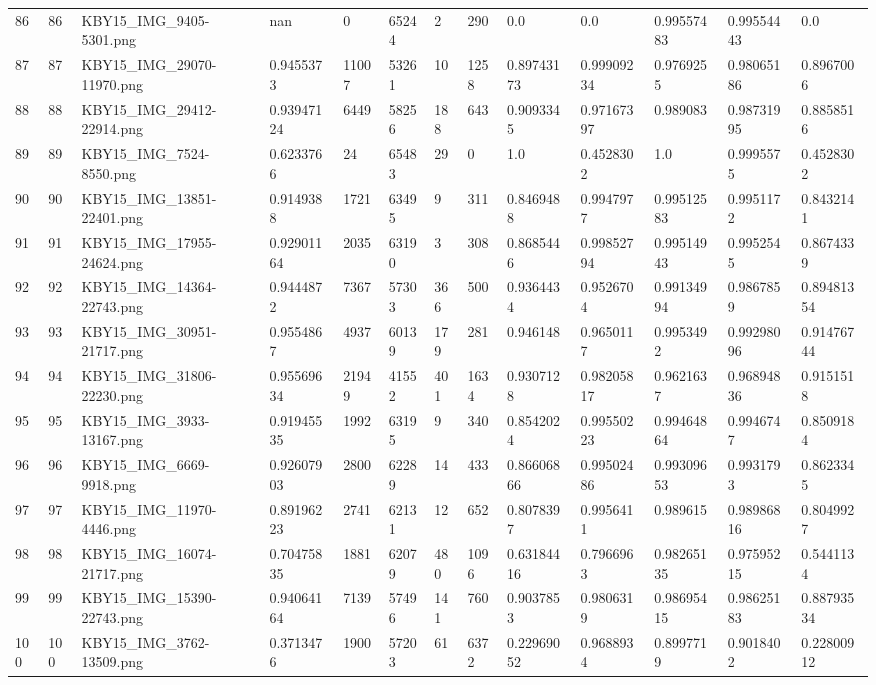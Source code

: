 \documentclass[11pt, a4paper, twoside]{report}
\begin{document}
\begin{longtable}[c]{@{}lllllllllllll@{}}
86 & 86 & KBY15\_IMG\_9405-5301.png & nan & 0 & 65244 & 2 & 290 & 0.0 & 0.0 & 0.99557483 & 0.99554443 & 0.0 \\
87 & 87 & KBY15\_IMG\_29070-11970.png & 0.9455373 & 11007 & 53261 & 10 & 1258 & 0.89743173 & 0.99909234 & 0.9769255 & 0.98065186 & 0.8967006 \\
88 & 88 & KBY15\_IMG\_29412-22914.png & 0.93947124 & 6449 & 58256 & 188 & 643 & 0.9093345 & 0.97167397 & 0.989083 & 0.98731995 & 0.8858516 \\
89 & 89 & KBY15\_IMG\_7524-8550.png & 0.6233766 & 24 & 65483 & 29 & 0 & 1.0 & 0.4528302 & 1.0 & 0.9995575 & 0.4528302 \\
90 & 90 & KBY15\_IMG\_13851-22401.png & 0.9149388 & 1721 & 63495 & 9 & 311 & 0.8469488 & 0.9947977 & 0.99512583 & 0.9951172 & 0.8432141 \\
91 & 91 & KBY15\_IMG\_17955-24624.png & 0.92901164 & 2035 & 63190 & 3 & 308 & 0.8685446 & 0.99852794 & 0.99514943 & 0.9952545 & 0.8674339 \\
92 & 92 & KBY15\_IMG\_14364-22743.png & 0.9444872 & 7367 & 57303 & 366 & 500 & 0.9364434 & 0.9526704 & 0.99134994 & 0.9867859 & 0.89481354 \\
93 & 93 & KBY15\_IMG\_30951-21717.png & 0.9554867 & 4937 & 60139 & 179 & 281 & 0.946148 & 0.9650117 & 0.9953492 & 0.99298096 & 0.91476744 \\
94 & 94 & KBY15\_IMG\_31806-22230.png & 0.95569634 & 21949 & 41552 & 401 & 1634 & 0.9307128 & 0.98205817 & 0.9621637 & 0.96894836 & 0.9151518 \\
95 & 95 & KBY15\_IMG\_3933-13167.png & 0.91945535 & 1992 & 63195 & 9 & 340 & 0.8542024 & 0.99550223 & 0.99464864 & 0.9946747 & 0.8509184 \\
96 & 96 & KBY15\_IMG\_6669-9918.png & 0.92607903 & 2800 & 62289 & 14 & 433 & 0.86606866 & 0.99502486 & 0.99309653 & 0.9931793 & 0.8623345 \\
97 & 97 & KBY15\_IMG\_11970-4446.png & 0.89196223 & 2741 & 62131 & 12 & 652 & 0.8078397 & 0.9956411 & 0.989615 & 0.98986816 & 0.8049927 \\
98 & 98 & KBY15\_IMG\_16074-21717.png & 0.70475835 & 1881 & 62079 & 480 & 1096 & 0.63184416 & 0.7966963 & 0.98265135 & 0.97595215 & 0.5441134 \\
99 & 99 & KBY15\_IMG\_15390-22743.png & 0.94064164 & 7139 & 57496 & 141 & 760 & 0.9037853 & 0.9806319 & 0.98695415 & 0.98625183 & 0.88793534 \\
100 & 100 & KBY15\_IMG\_3762-13509.png & 0.3713476 & 1900 & 57203 & 61 & 6372 & 0.22969052 & 0.9688934 & 0.8997719 & 0.9018402 & 0.22800912 \\

\end{longtable}
\end{document}
